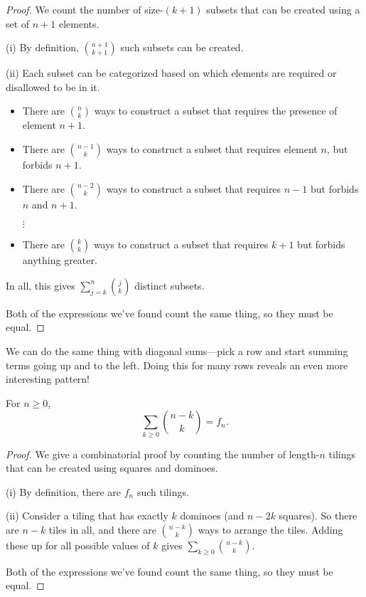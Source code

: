 \documentclass[../m055main.tex]{subfiles}
\begin{document}
\begin{proof}
    We count the number of size-$(k+1)$ subsets that can be created using a set of $n+1$ elements.
    \smallskip

    (i) By definition, ${n+1 \choose k+1}$ such subsets can be created.
    \smallskip

    (ii) Each subset can be categorized based on which elements are required or disallowed to be in it.
    \begin{itemize}
        \item There are ${n \choose k}$ ways to construct a subset that requires the presence of element $n+1$.
        \item There are ${n-1 \choose k}$ ways to construct a subset that requires element $n$, but forbids $n+1$.
        \item There are ${n-2 \choose k}$ ways to construct a subset that requires $n-1$ but forbids $n$ and $n+1$.
        \item[$\vdots$]
        \item There are ${k \choose k}$ ways to construct a subset that requires $k+1$ but forbids anything greater.
    \end{itemize}
    In all, this gives $\sum\limits_{j=k}^{n} {j \choose k}$ distinct subsets.

    Both of the expressions we've found count the same thing, so they must be equal.
\end{proof}

We can do the same thing with diagonal sums---pick a row and start summing terms going up and to the left.
Doing this for many rows reveals an even more interesting pattern!

\begin{theorem}
    For $n \geq 0$,
    \[ \sum_{k \geq 0} {n-k \choose k} = f_n. \]
\end{theorem}

\begin{proof}
    We give a combinatorial proof by counting the number of length-$n$ tilings that can be created using squares and dominoes.
    \smallskip

    (i) By definition, there are $f_n$ such tilings.
    \smallskip

    (ii) Consider a tiling that has exactly $k$ dominoes (and $n-2k$ squares).
    So there are $n-k$ tiles in all, and there are ${n-k \choose k}$ ways to arrange the tiles.
    Adding these up for all possible values of $k$ gives $\sum\limits_{k \geq 0} {n-k \choose k}$.

    Both of the expressions we've found count the same thing, so they must be equal.
\end{proof}
\end{document}

